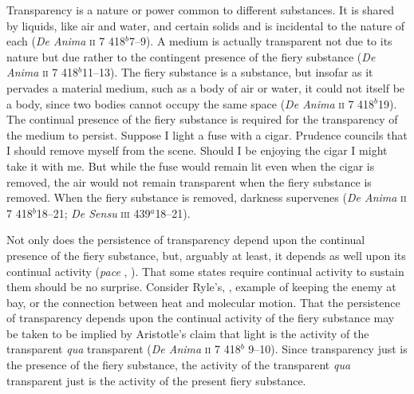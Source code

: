 Transparency is a nature or power common to different substances. It is shared by liquids, like air and water, and certain solids and is incidental to the nature of each (\emph{De Anima} \textsc{ii} 7 418\( ^{b} \)7--9). A medium is actually transparent not due to its nature but due rather to the contingent presence of the fiery substance (\emph{De Anima} \textsc{ii} 7 418\( ^{b} \)11--13). The fiery substance is a substance, but insofar as it pervades a material medium, such as a body of air or water, it could not itself be a body, since two bodies cannot occupy the same space (\emph{De Anima} \textsc{ii} 7 418\( ^{b} \)19). The continual presence of the fiery substance is required for the transparency of the medium to persist. Suppose I light a fuse with a cigar. Prudence councils that I should remove myself from the scene. Should I be enjoying the cigar I might take it with me. But while the fuse would remain lit even when the cigar is removed, the air would not remain transparent when the fiery substance is removed. When the fiery substance is removed, darkness supervenes (\emph{De Anima} \textsc{ii} 7 418\( ^{b} \)18--21; \emph{De Sensu} \textsc{iii} 439\( ^{a} \)18--21). 

Not only does the persistence of transparency depend upon the continual presence of the fiery substance, but, arguably at least, it depends as well upon its continual activity (\emph{pace} \citealt[]{Sambursky:1958aa}, \citealt[424]{Burnyeat:1995fk}). That some states require continual activity to sustain them should be no surprise. Consider Ryle's, \citeyearpar[149]{Ryle:1949qr}, example of keeping the enemy at bay, or the connection between heat and molecular motion. That the persistence of transparency depends upon the continual activity of the fiery substance may be taken to be implied by Aristotle's claim that light is the activity of the transparent \emph{qua} transparent (\emph{De Anima} \textsc{ii} 7 418\( ^{b} \) 9--10). Since transparency just is the presence of the fiery substance, the activity of the transparent \emph{qua} transparent just is the activity of the present fiery substance.

